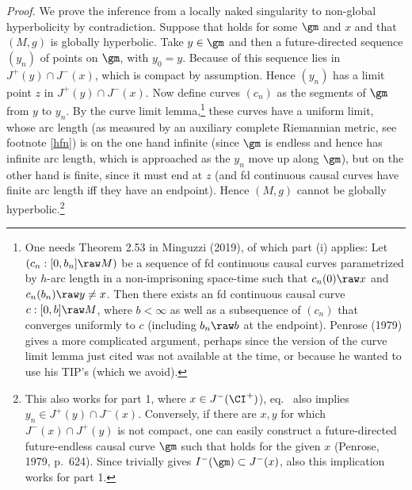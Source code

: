 \documentclass[11pt,a4paper]{article}
\begin{document}
\noindent 
\emph{Proof.}  We  prove the inference from a locally naked singularity to non-global hyperbolicity by contradiction.  Suppose that  holds for some $\gm$ and $x$ and that $(M,g)$ is globally hyperbolic.
 Take $y\in \gm$ and then a future-directed sequence $(y_n)$ of points on $\gm$, with $y_0=y$. 
 Because of  this sequence lies in  $J^+(y)\cap J^-(x)$, which is compact by assumption. Hence 
 $(y_n)$ has a limit point $z$ in  $J^+(y)\cap J^-(x)$. Now define curves $(c_n)$ as the segments of $\gm$ from $y$ to $y_n$.
 By the curve limit lemma,\footnote{One needs Theorem 2.53 in Minguzzi (2019), of which part (i) applies:
 Let $(c_n: [0,b_n]\raw M)$ be a sequence of fd continuous causal curves parametrized by $h$-arc length in a non-imprisoning space-time such that $c_n(0)\raw x$ and $c_n(b_n)\raw y\neq x$. Then there exists an fd continuous causal curve $c:[0,b]\raw M$,
where $b<\infty$ as well as a subsequence of $(c_n)$ that converges uniformly to $c$ (including
$b_n\raw b$ at the endpoint).
  Penrose (1979) gives a more complicated argument, perhaps since the version of the  curve limit lemma just cited was not available at the time, or because he wanted to use his TIP's (which we avoid).} these curves have a uniform limit, whose arc length (as measured by an auxiliary complete Riemannian metric, see footnote \ref{hfn})
  is on the one hand infinite (since $\gm$ is endless and hence has infinite arc length, which is approached as the $y_n$ move up along $\gm$), but on the other hand is finite, since it must end at $z$ (and fd continuous causal curves have finite arc length iff they have an endpoint). 
   Hence $(M,g)$ cannot be globally hyperbolic.\footnote{This also works for part 1, where  $x\in J^-(\CI^+)$), eq.\   also implies $y_n\in  J^+(y)\cap J^-(x)$.
    Conversely, 
if there are $x,y$ for which $J^-(x)\cap J^+(y)$ is not compact, one can easily construct  a future-directed future-endless causal curve $\gm$ such that  holds for the given $x$ (Penrose, 1979, p.\ 624). Since   trivially gives $I^-(\gm)\subset J^-(x)$, also this implication works for  part 1.}
 \enp\smallskip
\end{document}
